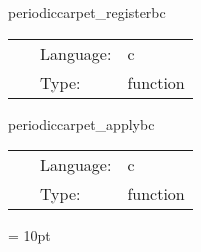 \hspace{5mm} periodiccarpet\_registerbc 

\hspace{5mm}{\it register periodic boundary conditions } 


\hspace{5mm}

 \begin{tabular*}{160mm}{cll} 
~ & Language:  & c \\ 
~ & Type:  & function \\ 
\end{tabular*} 


\vspace{5mm}


\hspace{5mm} periodiccarpet\_applybc 

\hspace{5mm}{\it apply periodic boundary conditions } 


\hspace{5mm}

 \begin{tabular*}{160mm}{cll} 
~ & Language:  & c \\ 
~ & Type:  & function \\ 
\end{tabular*} 



\vspace{5mm}\parskip = 10pt 

